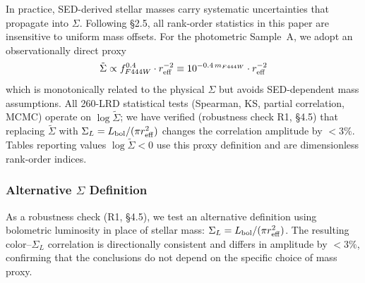 \documentclass[apj,twocolumn,longbibliography,linenumbers]{aastex701}
\begin{document}
In practice, SED-derived stellar masses carry systematic uncertainties that propagate into $\Sigma$. Following \S2.5, all rank-order statistics in this paper are insensitive to uniform mass offsets. For the photometric Sample~A, we adopt an observationally direct proxy
\begin{equation}
\tilde\Sigma \propto f_{F444W}^{0.4} \cdot r_{\rm eff}^{-2} \equiv 10^{-0.4\,m_{F444W}} \cdot r_{\rm eff}^{-2}
\label{eq:Sigma_proxy}
\end{equation}
which is monotonically related to the physical $\Sigma$ but avoids SED-dependent mass assumptions. All 260-LRD statistical tests (Spearman, KS, partial correlation, MCMC) operate on $\log\tilde\Sigma$; we have verified (robustness check R1, \S4.5) that replacing $\tilde\Sigma$ with $\Sigma_L = L_{\rm bol}/(\pi r_{\rm eff}^2)$ changes the correlation amplitude by $<3\%$. Tables reporting values $\log\tilde\Sigma < 0$ use this proxy definition and are dimensionless rank-order indices.

\begin{table}[h]
\caption{Properties of the LRD Samples}
\label{tab:sample_properties}
\centering
\small
{}
\end{table}

\subsubsection{Alternative $\Sigma$ Definition}

As a robustness check (R1, \S4.5), we test an alternative definition using bolometric luminosity in place of stellar mass: $\Sigma_L = L_{\rm bol}/(\pi r_{\rm eff}^2)$. The resulting color--$\Sigma_L$ correlation is directionally consistent and differs in amplitude by $<3\%$, confirming that the conclusions do not depend on the specific choice of mass proxy.
\end{document}
